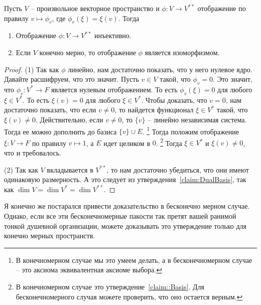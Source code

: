 \begin{claim}
\label{claim::DoubleDuoIsom}
Пусть $V$ -- произвольное векторное пространство и $\phi\colon V\to V^{**}$ отображение по правилу $v\mapsto \phi_v$, где $\phi_v(\xi) = \xi(v)$.
Тогда 
\begin{enumerate}
\item Отображение $\phi\colon V\to V^{**}$ инъективно.

\item Если $V$ конечно мерно, то отображение $\phi$ является изоморфизмом.
\end{enumerate}
\end{claim}
\begin{proof}
(1) Так как $\phi$ линейно, нам достаточно показать, что у него нулевое ядро.
Давайте расшифруем, что это значит.
Пусть $v\in V$ такой, что $\phi_v = 0$.
Это значит, что $\phi_v \colon V^* \to F$ является нулевым отображением.
То есть $\phi_v(\xi) = 0$ для любого $\xi \in V^*$.
То есть $\xi(v) = 0$ для любого $\xi \in V^*$.
Чтобы доказать, что $v = 0$, нам достаточно показать, что если $v\neq0$, то найдется функционал $\xi \in V^*$ такой, что $\xi(v)\neq 0$.
Действительно, если $v\neq 0$, то $\{v\}$ -- линейно независимая система.
Тогда ее можно дополнить до базиса $\{v\}\cup E$.%
\footnote{В конечномерном случае мы это умеем делать, а в бесконечномерном случае -- это аксиома эквивалентная аксиоме выбора.}
Тогда положим отображение $\xi \colon V\to F$ по правилу $v\mapsto 1$, а $E$ идет целиком в $0$.%
\footnote{В конечномерном случае это утверждение~\ref{claim::Basis}.
Для бесконечномерного случая можете проверить, что оно остается верным.}
Тогда $\xi\in V^*$ и $\xi(v)\neq 0$, что и требовалось.

(2) Так как $V$ вкладывается в $V^{**}$, то нам достаточно убедиться, что они имеют одинаковую размерность.
А это следует из утверждения~\ref{claim:DualBasis}, так как $\dim V = \dim V^* = \dim V^{**}$.
\end{proof}

Я конечно же постарался привести доказательство в бесконечно мерном случае.
Однако, если все эти бесконечномерные пакости так претят вашей ранимой тонкой душевной организации, можете доказывать это утверждение только для конечно мерных пространств.

